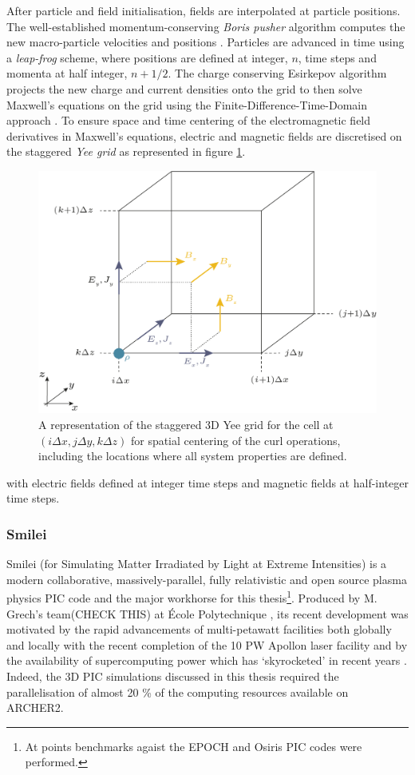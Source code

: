 After particle and field initialisation, fields are interpolated at particle positions. The well-established momentum-conserving \textit{Boris pusher} algorithm computes the new macro-particle velocities and positions \cite{borisRelativisticPlasmaSimulationoptimization1970}. Particles are advanced in time using a \textit{leap-frog }scheme, where positions are defined at integer, $n$, time steps and momenta at half integer, $n + 1/2$. The charge conserving Esirkepov algorithm \cite{esirkepovExactChargeConservation2001} projects the new charge and current densities onto the grid to then solve Maxwell's equations on the grid using the Finite-Difference-Time-Domain approach \cite{tafloveComputationalElectromagneticsFiniteDifference2005}. To ensure space and time centering of the electromagnetic field derivatives in Maxwell's equations, electric and magnetic fields are discretised on the staggered \textit{Yee grid} as represented in figure \ref{fig:introyeegrid}. 
\begin{figure}
	\centering
	\includegraphics[width=0.7\linewidth]{figures/intro/intro_yee_grid}
	\caption[A representation of the staggered Yee grid.]{A representation of the staggered 3D Yee grid for the cell at $(i\Delta x, j\Delta y, k\Delta z)$ for spatial centering of the curl operations, including the locations where all system properties are defined.}
	\label{fig:introyeegrid}
\end{figure}
with electric fields defined at integer time steps and magnetic fields at half-integer time steps.


\subsubsection{Smilei}
Smilei (for Simulating Matter Irradiated by Light at Extreme Intensities) is a modern collaborative, massively-parallel, fully relativistic and open source plasma physics PIC code and the major workhorse for this thesis\footnote{At points benchmarks agaist the EPOCH and Osiris PIC codes were performed.}. Produced by M. Grech's team(CHECK THIS) at École Polytechnique \cite{derouillatSmileiCollaborativeOpensource2018}, its recent development was motivated by the rapid advancements of multi-petawatt facilities both globally and locally with the recent completion of the 10 PW Apollon laser facility and by the availability of supercomputing power which has `skyrocketed' in recent years \cite{derouillatSmileiCollaborativeOpensource2018}. Indeed, the 3D \ac{PIC} simulations discussed in this thesis required the parallelisation of almost 20 \% of the computing resources available on ARCHER2.

